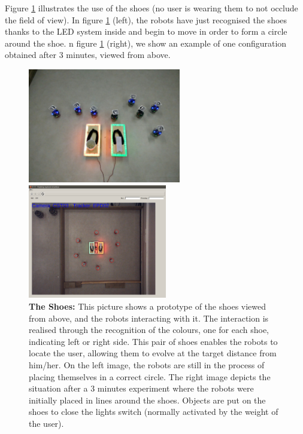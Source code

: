 \documentclass[oneside, a4paper, 12pt]{memoir}
\let\oldCaption\caption
\renewcommand{\caption}[2]{
\oldCaption[#1]{{\small\sffamily\bfseries #1:} #2}
}
\begin{document}
	Figure \ref{fig:shoes} illustrates the use of the shoes (no user is wearing them to not occlude the field of view). In figure \ref{fig:shoes} (left), the robots have just recognised the shoes thanks to the LED system inside and begin to move in order to form a circle around the shoe. n figure \ref{fig:shoes} (right), we show an example of one configuration obtained after 3 minutes, viewed from above.\\
	
	\begin{figure}
		\begin{minipage}[c]{0.6\textwidth}
			\includegraphics[trim=200px 300px 140px 300px, clip=true, height=5cm]{images/shoes.jpg}
		\end{minipage}
		\hfill
		\begin{minipage}[c]{0.39\textwidth}
			\hfill\includegraphics[trim=380px 230px 380px 360px, clip=true, height=5cm]{../Experiments/No_Human/6end.png}
		\end{minipage}				
		
		\caption{The Shoes}{This picture shows a prototype of the shoes viewed from above, and the robots interacting with it. The interaction is realised through the recognition of the colours, one for each shoe, indicating left or right side. This pair of shoes enables the robots to locate the user, allowing them to evolve at the target distance from him/her. On the left image, the robots are still in the process of placing themselves in a correct circle. The right image depicts the situation after a 3 minutes experiment where the robots were initially placed in lines around the shoes. Objects are put on the shoes to close the lights switch (normally activated by the weight of the user).}
		\label{fig:shoes}
	\end{figure}
\end{document}
